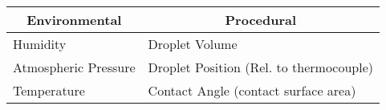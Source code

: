 \begin{table}[h]
    \centering
    \begin{tabular}{|l|l|}
    \hline
    \multicolumn{1}{|c|}{\textbf{Environmental}} & \multicolumn{1}{c|}{\textbf{Procedural}} \\ \hline
    Humidity                                     & Droplet Volume                          \\ \hline
    Atmospheric Pressure                        & Droplet Position (Rel. to thermocouple) \\ \hline
    Temperature                                  & Contact Angle (contact surface area)    \\ \hline
    \end{tabular}
    \end{table}